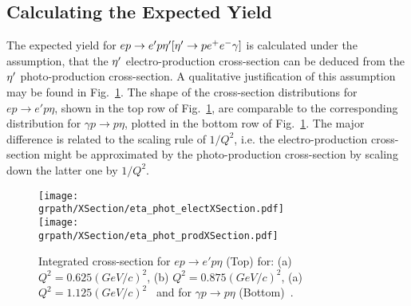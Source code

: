 \subsection{Calculating the Expected Yield}\label{sec:yield}

The expected yield for $ep\to e'p \eta^{\prime} [\eta^{\prime}\rightarrow p e^+e^- \gamma ]$ is calculated under the assumption, that the $\eta^{\prime}$ electro-production cross-section can be deduced from the $\eta^{\prime}$ photo-production cross-section. A qualitative justification of this assumption may be found in Fig.~\ref{fig:EtaProdX}. The shape of the cross-section distributions for $ep\rightarrow e'p\eta$, shown in the top row of Fig.~\ref{fig:EtaProdX}, are comparable to the corresponding distribution for $\gamma p\rightarrow p\eta$, plotted in the bottom row of Fig.~\ref{fig:EtaProdX}. The major difference is related to the scaling rule of $1/Q^2$, i.e. the electro-production cross-section might be approximated by the photo-production cross-section by scaling down the latter one by $1/Q^2$.

\begin{figure}[htbp]\begin{center}
		\texttt{[image: \\grpath/XSection/eta\_phot\_electXSection.pdf]}\\
		\texttt{[image: \\grpath/XSection/eta\_phot\_prodXSection.pdf]}
		\caption[eta el-prod. XSection]{\label{fig:EtaProdX}{Integrated cross-section for $ep\to e'p\eta$ (Top) for: (a) $Q^2=0.625(GeV/c)^2$, (b) $Q^2=0.875(GeV/c)^2$, (a) $Q^2=1.125(GeV/c)^2$~\cite{etaelect} and for $\gamma p\rightarrow p\eta$ (Bottom)~\cite{etaphoto}.}}
\end{center}\end{figure}

\FloatBarrier

